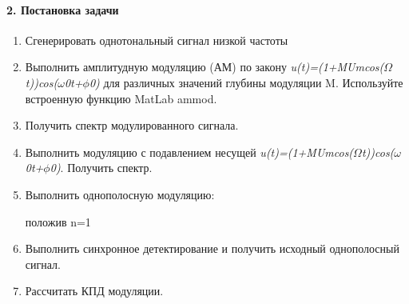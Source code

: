 \documentclass[12pt,a4paper]{report}
\begin{document}
\paragraph{2. Постановка задачи\\}
\begin{enumerate}
\item Сгенерировать однотональный сигнал низкой частоты 
\item Выполнить амплитудную модуляцию (АМ) по закону \textit{u(t)=(1+MU\tiny{m}\normalsize{cos(\begin{math}\Omega\end{math}t))cos(\begin{math}\omega\end{math}\tiny{0}\normalsize{t}+\begin{math}\phi\end{math}\tiny{0}\normalsize)}} для различных значений глубины модуляции M. Используйте встроенную функцию
MatLab ammod.
\item Получить спектр модулированного сигнала.
\item Выполнить модуляцию с подавлением несущей 
\textit{u(t)=(1+MU\tiny{m}\normalsize{cos(\begin{math}\Omega\end{math}t))cos(\begin{math}\omega\end{math}\tiny{0}\normalsize{t}+\begin{math}\phi\end{math}\tiny{0}\normalsize)}}. Получить спектр.
\item Выполнить однополосную модуляцию:

\begin{figure}[h!]
\end{figure}

положив n=1

\item Выполнить синхронное детектирование и получить исходный однополосный сигнал.
\item Рассчитать КПД модуляции.

\begin{figure}[h!]
\end{figure}


\end{enumerate}
\end{document}

